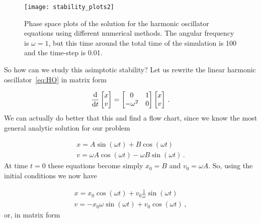 \documentclass[12pt, class=report, crop=false]{standalone}
\begin{document}
\begin{figure}[h]
  \centering
  \texttt{[image: stability\_plots2]}%
  \caption{Phase space plots of the solution for the harmonic oscillator equations using different numerical methods. The angular frequency is \(\omega =1\),  but this time around the total time of the simulation is 100 and the time-step is 0.01.}\label{fig:stability2}%
\end{figure}

So how can we study this asimptotic stability? Let us rewrite the linear harmonic oscillator~\cref{eq:HO} in matrix form

\begin{equation}
  \dv{t}
  \begin{bmatrix}
    x\\ v
  \end{bmatrix}
  =
  \begin{bmatrix}
    0 & 1\\
    -\omega^2 & 0
  \end{bmatrix}
  \begin{bmatrix}
    x\\ v
  \end{bmatrix}\,.
\end{equation}
We can actually do better that this and find a flow chart, since we know the most general analytic solution for our problem

\begin{subequations}
  \begin{align}
    x = A \sin(\omega t) + B \cos(\omega t)\\
    v = \omega A \cos(\omega t) -  \omega B \sin(\omega t)\,.
  \end{align}
\end{subequations}
At time \(t=0\) these equations become simply \(x_0 = B\) and \(v_0 = \omega A\). So, using the initial conditions we now have

\begin{subequations}
  \begin{align}
    x = x_0 \cos(\omega t) + v_0 \frac{1}{\omega} \sin(\omega t)\\
    v = - x_0 \omega \sin(\omega t) + v_0 \cos(\omega t)\,,
  \end{align}
\end{subequations}
or, in matrix form
\end{document}

